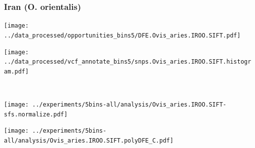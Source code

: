 \subsubsection{Iran (O. orientalis)}

\begin{minipage}{0.49\linewidth}
    \texttt{[image: ../data\_processed/opportunities\_bins5/DFE.Ovis\_aries.IROO.SIFT.pdf]}
\end{minipage}
\begin{minipage}{0.49\linewidth}
    \texttt{[image: ../data\_processed/vcf\_annotate\_bins5/snps.Ovis\_aries.IROO.SIFT.histogram.pdf]}
\end{minipage}
\\
\begin{minipage}{0.49\linewidth}
    \texttt{[image: ../experiments/5bins-all/analysis/Ovis\_aries.IROO.SIFT-sfs.normalize.pdf]}
\end{minipage}
\begin{minipage}{0.4\linewidth}
    \texttt{[image: ../experiments/5bins-all/analysis/Ovis\_aries.IROO.SIFT.polyDFE\_C.pdf]}
\end{minipage}
